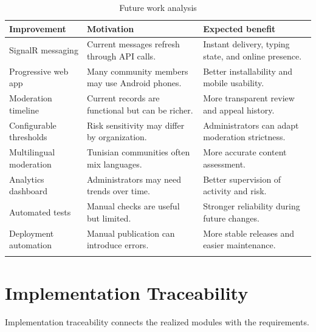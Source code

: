 \begin{longtable}{|m{3.5cm}|m{5.2cm}|m{5.4cm}|}
\hline
\textbf{Improvement} & \textbf{Motivation} & \textbf{Expected benefit} \\
\hline
SignalR messaging & Current messages refresh through API calls. & Instant delivery, typing state, and online presence. \\
\hline
Progressive web app & Many community members may use Android phones. & Better installability and mobile usability. \\
\hline
Moderation timeline & Current records are functional but can be richer. & More transparent review and appeal history. \\
\hline
Configurable thresholds & Risk sensitivity may differ by organization. & Administrators can adapt moderation strictness. \\
\hline
Multilingual moderation & Tunisian communities often mix languages. & More accurate content assessment. \\
\hline
Analytics dashboard & Administrators may need trends over time. & Better supervision of activity and risk. \\
\hline
Automated tests & Manual checks are useful but limited. & Stronger reliability during future changes. \\
\hline
Deployment automation & Manual publication can introduce errors. & More stable releases and easier maintenance. \\
\hline
\caption{Future work analysis}
\end{longtable}

\section{Implementation Traceability}

Implementation traceability connects the realized modules with the requirements.

